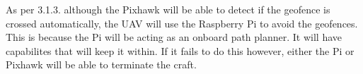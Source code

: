 As per 3.1.3. although the Pixhawk will be able to detect if the geofence is crossed automatically, the UAV will use the Raspberry Pi to avoid the geofences. This is because the Pi will be acting as an onboard path planner. It will have capabilites that will keep it within. If it fails to do this however, either the Pi or Pixhawk will be able to terminate the craft.  